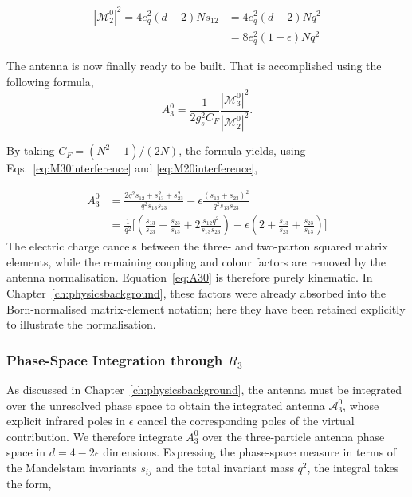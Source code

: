 \begin{equation}\label{eq:M20interference}
    \begin{split}
        |\mathcal M_2^0|^2 = 4e_q^2(d-2)Ns_{12} &= 4e_q^2(d-2)Nq^2\\
                                                       &= 8e_q^2(1-\epsilon)Nq^2
    \end{split}
\end{equation}


The antenna is now finally ready to be built. That is accomplished using the following formula,
\begin{equation}
    A_3^0 = \frac1{2g_s^2C_F}\frac{|\mathcal M_3^0|^2}{|\mathcal M_2^0|^2}.
\end{equation}

By taking $C_F = (N^2-1)/(2N)$, the formula yields, using Eqs.~\eqref{eq:M30interference} and \eqref{eq:M20interference},

\begin{equation}\label{eq:A30}
    \begin{split}
        A_3^0 &= \frac{2q^2s_{12}+s_{13}^2+s_{23}^2}{q^2s_{13}s_{23}}-\epsilon\frac{(s_{13}+s_{23})^2}{q^2s_{13}s_{23}}\\
              &= \frac1{q^2}\Bigg[\left(\frac{s_{13}}{s_{23}}+\frac{s_{23}}{s_{13}}+2\frac{s_{12}q^2}{s_{13}s_{23}}\right)-\epsilon\left(2+\frac{s_{13}}{s_{23}}+\frac{s_{23}}{s_{13}}\right)\Bigg]
    \end{split}
\end{equation}
The electric charge cancels between the three- and two-parton squared matrix elements, while the
remaining coupling and colour factors are removed by the antenna normalisation.
Equation~\eqref{eq:A30} is therefore purely kinematic. In Chapter~\ref{ch:physicsbackground}, these
factors were already absorbed into the Born-normalised matrix-element notation; here they have been
retained explicitly to illustrate the normalisation.


\subsubsection*{Phase-Space Integration through $R_3$}

As discussed in Chapter~\ref{ch:physicsbackground}, the antenna must be integrated over the unresolved
phase space to obtain the integrated antenna $\mathcal A_3^0$, whose explicit infrared poles in
$\epsilon$ cancel the corresponding poles of the virtual contribution. We therefore integrate $A_3^0$
over the three-particle antenna phase space in $d=4-2\epsilon$ dimensions. Expressing the phase-space
measure in terms of the Mandelstam invariants $s_{ij}$ and the total invariant mass $q^2$, the
integral takes the form,

